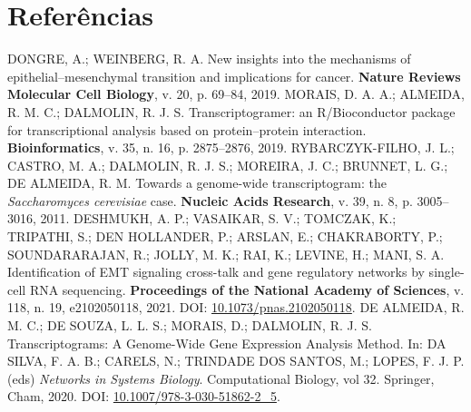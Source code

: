 \documentclass[12pt]{article}
\begin{document}
\newpage

\section{Referências}
\begin{thebibliography}{99}
 DONGRE, A.; WEINBERG, R. A. New insights into the mechanisms of epithelial–mesenchymal transition and implications for cancer. \textbf{Nature Reviews Molecular Cell Biology}, v. 20, p. 69–84, 2019.
 MORAIS, D. A. A.; ALMEIDA, R. M. C.; DALMOLIN, R. J. S. Transcriptogramer: an R/Bioconductor package for transcriptional analysis based on protein–protein interaction. \textbf{Bioinformatics}, v. 35, n. 16, p. 2875–2876, 2019.
 RYBARCZYK-FILHO, J. L.; CASTRO, M. A.; DALMOLIN, R. J. S.; MOREIRA, J. C.; BRUNNET, L. G.; DE ALMEIDA, R. M. Towards a genome-wide transcriptogram: the \textit{Saccharomyces cerevisiae} case. \textbf{Nucleic Acids Research}, v. 39, n. 8, p. 3005–3016, 2011.
 DESHMUKH, A. P.; VASAIKAR, S. V.; TOMCZAK, K.; TRIPATHI, S.; DEN HOLLANDER, P.; ARSLAN, E.; CHAKRABORTY, P.; SOUNDARARAJAN, R.; JOLLY, M. K.; RAI, K.; LEVINE, H.; MANI, S. A. Identification of EMT signaling cross-talk and gene regulatory networks by single-cell RNA sequencing. \textbf{Proceedings of the National Academy of Sciences}, v. 118, n. 19, e2102050118, 2021. DOI: \href{https://doi.org/10.1073/pnas.2102050118}{10.1073/pnas.2102050118}.
 DE ALMEIDA, R. M. C.; DE SOUZA, L. L. S.; MORAIS, D.; DALMOLIN, R. J. S. Transcriptograms: A Genome-Wide Gene Expression Analysis Method. In: DA SILVA, F. A. B.; CARELS, N.; TRINDADE DOS SANTOS, M.; LOPES, F. J. P. (eds) \textit{Networks in Systems Biology}. Computational Biology, vol 32. Springer, Cham, 2020. DOI: \href{https://doi.org/10.1007/978-3-030-51862-2_5}{10.1007/978-3-030-51862-2_5}.

\end{thebibliography}
\end{document}
